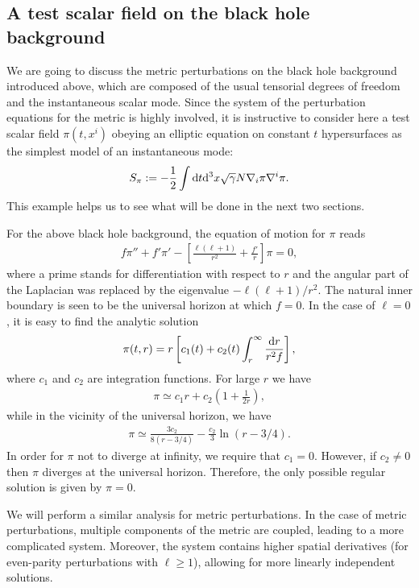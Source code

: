 \documentclass[aps,prd,preprintnumbers,superscriptaddress,nofootinbib,notitlepage]{revtex4-2}
\newcommand*{\D}{{\rm d}}
\begin{document}
\subsection{A test scalar field on the black hole background}

We are going to discuss the metric perturbations on the black hole background introduced above,
which are composed of the usual tensorial degrees of freedom and the instantaneous scalar mode.
Since the system of the perturbation equations for the metric is highly involved,
it is instructive to consider here a test scalar field $\pi(t,x^i)$ obeying an elliptic equation on
constant $t$ hypersurfaces as the simplest model of an instantaneous mode:
\begin{align}
    S_\pi:=-\frac{1}{2}\int\D t\D^3x \sqrt{\gamma}N\nabla_i\pi\nabla^i\pi. 
\end{align}
This example helps us to see what will be done in the next two sections.


For the above black hole background, the equation of motion for $\pi$ reads
\begin{align}
    f\pi''+f'\pi'-\left[\frac{\ell(\ell+1)}{r^2}+\frac{f'}{r}\right]\pi=0,
\end{align}
where a prime stands for differentiation with respect to $r$ and
the angular part of the Laplacian was replaced by the eigenvalue $-\ell(\ell+1)/r^2$.
The natural inner boundary is seen to be the universal horizon at which $f=0$.
In the case of $\ell=0$, it is easy to find the analytic solution
\begin{align}
    \pi(t,r) = r\left[c_1(t)+c_2(t)\int_r^\infty\frac{\D r}{r^2f}\right],
\end{align}
where $c_1$ and $c_2$ are integration functions.
For large $r$ we have
\begin{align}
    \pi\simeq c_1 r+c_2\left(1+\frac{1}{2r}\right),
\end{align}
while in the vicinity of the universal horizon, we have 
\begin{align}
    \pi\simeq \frac{3c_2}{8(r-3/4)}-\frac{c_2}{3}\ln(r-3/4).
\end{align}
In order for $\pi$ not to diverge at infinity, we require that $c_1=0$.
However, if $c_2\neq 0$ then $\pi$ diverges at the universal horizon.
Therefore, the only possible regular solution is given by $\pi=0$.





We will perform a similar analysis for metric perturbations.
In the case of metric perturbations, multiple components of the metric are coupled,
leading to a more complicated system.
Moreover, the system contains higher spatial derivatives
(for even-parity perturbations with $\ell\ge 1$), allowing for more linearly independent solutions.
\end{document}
